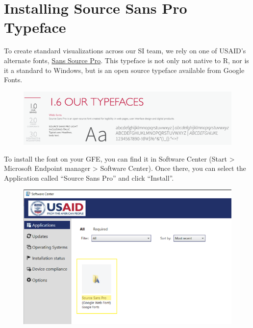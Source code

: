 \documentclass[
  letterpaper,
  DIV=11,
  numbers=noendperiod]{scrreprt}
\begin{document}
\hypertarget{installing-source-sans-pro-typeface}{%
\chapter{Installing Source Sans Pro
Typeface}\label{installing-source-sans-pro-typeface}}

To create standard visualizations across our SI team, we rely on one of
USAID's alternate fonts,
\href{https://fonts.google.com/specimen/Source+Sans+Pro}{Sans Source
Pro}. This typeface is not only not native to R, nor is it a standard to
Windows, but is an open source typeface available from Google Fonts.

\begin{figure}

{\centering \includegraphics{./images/typeface_setup-usaid-style_font.png}

}

\end{figure}

To install the font on your GFE, you can find it in Software Center
(Start \textgreater{} Microsoft Endpoint manager \textgreater{} Software
Center). Once there, you can select the Application called ``Source Sans
Pro'' and click ``Install''.

\begin{figure}

{\centering \includegraphics{./images/typeface_setup-software-center_font.png}

}

\end{figure}
\end{document}
